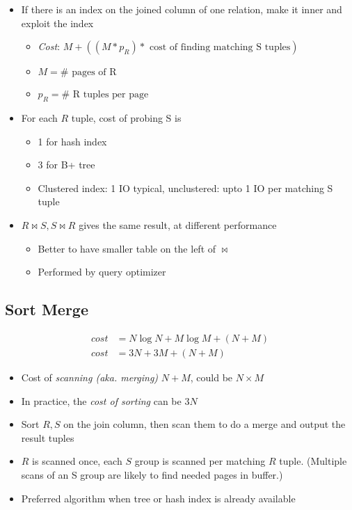     \begin{itemize}
      \item If there is an index on the joined column of one relation, make it inner
      and exploit the index
      \begin{itemize}
        \item \emph{Cost}: $ M + \left( \left( M * p_{R} \right) * \text{ cost of finding matching S tuples} \right) $
        \item $ M = \# \text{ pages of R } $
        \item $ p_{R} = \# \text{ R tuples per page} $
      \end{itemize}

      \item For each $ R $ tuple, cost of probing S is
      \begin{itemize}
        \item 1 for hash index
        \item 3 for B+ tree
        \item Clustered index: 1 IO typical, unclustered: upto 1 IO per matching
        S tuple
      \end{itemize}

      \item $ R \Join S, S \Join R $ gives the same result, at different performance
      \begin{itemize}
        \item Better to have smaller table on the left of $ \Join $
        \item Performed by query optimizer
      \end{itemize}
    \end{itemize}

  \subsection{Sort Merge}

    \begin{align}
      cost &= N \log N + M \log M + \left( N + M \right) \\
      cost &= 3 N + 3 M + \left( N + M \right)
    \end{align}

    \begin{itemize}
      \item Cost of \emph{scanning (aka. merging)} $ N + M $, could be $ N \times M $
      \item In practice, the \emph{cost of sorting} can be $ 3 N $
      \item Sort $ R, S $ on the join column, then scan them to do a merge
      and output the result tuples
      \item $ R $ is scanned once, each $ S $ group is scanned per matching
      $ R $ tuple. (Multiple scans of an S group are likely to find needed pages in buffer.)
      \item Preferred algorithm when tree or hash index is already available
    \end{itemize}

